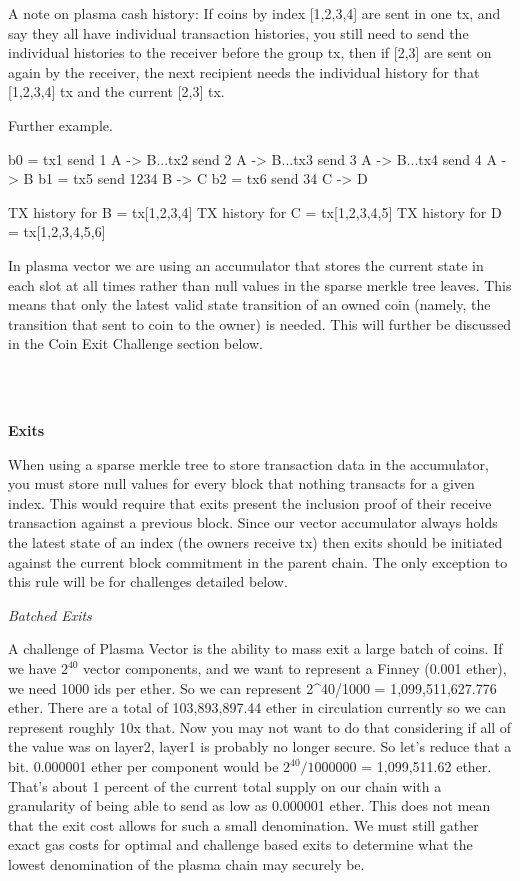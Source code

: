 \documentclass[11pt]{article}
\begin{document}
A note on plasma cash history:
If coins by index [1,2,3,4] are sent in one tx, and say they all have individual transaction histories, you still need to send the individual histories to the receiver before the group tx, then if [2,3] are sent on again by the receiver, the next recipient needs the individual history for that [1,2,3,4] tx and the current [2,3] tx.

Further example.

b0 = tx1 send 1 A -> B...tx2 send 2 A -> B...tx3 send 3 A -> B...tx4 send 4 A -> B
b1 = tx5 send 1234 B -> C
b2 = tx6 send 34 C -> D

TX history for B = tx[1,2,3,4]
TX history for C = tx[1,2,3,4,5]
TX history for D = tx[1,2,3,4,5,6]

In plasma vector we are using an accumulator that stores the current state in each slot at all times rather than null values in the sparse merkle tree leaves. This means that only the latest valid state transition of an owned coin (namely, the transition that sent to coin to the owner) is needed. This will further be discussed in the Coin Exit Challenge section below.

\\
\\

\centerline{\textbf{Exits}}

When using a sparse merkle tree to store transaction data in the accumulator, you must store null values for every block that nothing transacts for a given index. This would require that exits present the inclusion proof of their receive transaction against a previous block. Since our vector accumulator always holds the latest state of an index (the owners receive tx) then exits should be initiated against the current block commitment in the parent chain. The only exception to this rule will be for challenges detailed below.


\centerline{\textit{Batched Exits}}

A challenge of Plasma Vector is the ability to mass exit a large batch of coins. If we have $2^{40}$ vector components, and we want to represent a Finney (0.001 ether), we need 1000 ids per ether. So we can represent 2^40/1000 = 1,099,511,627.776 ether. There are a total of 103,893,897.44 ether in circulation currently so we can represent roughly  10x that. Now you may not want to do that considering if all of the value was on layer2, layer1 is probably no longer secure. So let's reduce that a bit. 0.000001 ether per component would be $2^{40}/1000000$ = 1,099,511.62 ether. That's about 1 percent of the current total supply on our chain with a granularity of being able to send as low as 0.000001 ether. This does not mean that the exit cost allows for such a small denomination. We must still gather exact gas costs for optimal and challenge based exits to determine what the lowest denomination of the plasma chain may securely be. 
\end{document}
